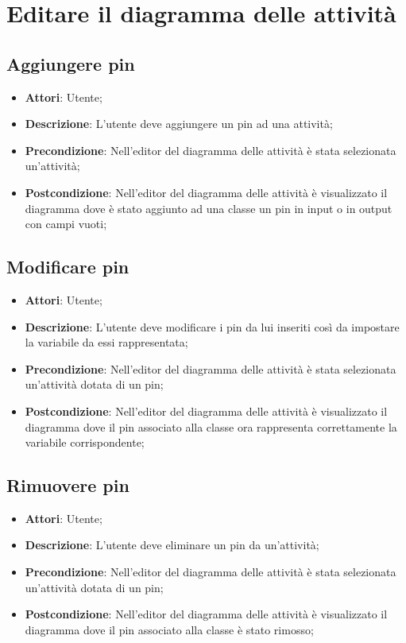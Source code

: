 \documentclass[../AnalisiDeiRequisiti.tex]{subfiles}
\begin{document}
	\section{Editare il diagramma delle attività}
	\subsection{Aggiungere pin}
	\begin{itemize}
		\item \textbf{Attori}: Utente;
		\item \textbf{Descrizione}: L’utente deve aggiungere un pin ad una attività;
		\item \textbf{Precondizione}: Nell'editor del diagramma delle attività è stata selezionata un'attività;
		\item \textbf{Postcondizione}: Nell'editor del diagramma delle attività è visualizzato il diagramma dove è stato aggiunto ad una classe un pin in input o in output con campi vuoti;
	\end{itemize}
	
	\subsection{Modificare pin}
	\begin{itemize}
		\item \textbf{Attori}: Utente;
		\item \textbf{Descrizione}: L’utente deve modificare i pin da lui inseriti così da impostare la variabile da essi rappresentata;
		\item \textbf{Precondizione}: Nell'editor del diagramma delle attività è stata selezionata un'attività dotata di un pin;
		\item \textbf{Postcondizione}: Nell'editor del diagramma delle attività è visualizzato il diagramma dove il pin associato alla classe ora rappresenta correttamente la variabile corrispondente;
	\end{itemize}
	
	\subsection{Rimuovere pin}
	\begin{itemize}
		\item \textbf{Attori}: Utente;
		\item \textbf{Descrizione}: L’utente deve eliminare un pin da un’attività;
		\item \textbf{Precondizione}: Nell'editor del diagramma delle attività è stata selezionata un'attività dotata di un pin;
		\item \textbf{Postcondizione}: Nell'editor del diagramma delle attività è visualizzato il diagramma dove il pin associato alla classe è stato rimosso;
	\end{itemize}
\end{document}
